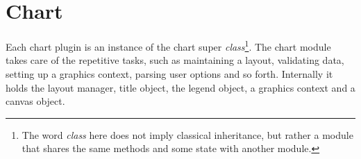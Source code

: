 \section{Chart}
Each chart plugin is an instance of the chart super \emph{class}\footnote{The word \emph{class} here does not imply classical inheritance, but rather a module that shares the same methods and some state with another module.}. The chart module takes care of the repetitive tasks, such as maintaining a layout, validating data, setting up a graphics context, parsing user options and so forth. Internally it holds the layout manager, title object, the legend object, a graphics context and a canvas object.
